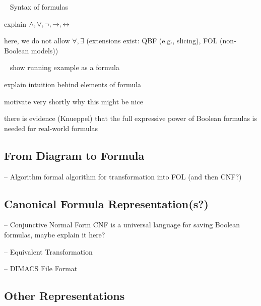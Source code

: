 \begin{frame}{~}
	Syntax of formulas

	explain $\wedge, \vee, \neg, \rightarrow, \leftrightarrow$

	here, we do not allow $\forall, \exists$ (extensions exist: QBF (e.g., slicing), FOL (non-Boolean models))
\end{frame}

\begin{frame}{~}
	show running example as a formula
	
	explain intuition behind elements of formula

	motivate very shortly why this might be nice

	there is evidence (Knueppel) that the full expressive power of Boolean formulas is needed for real-world formulas
\end{frame}

\subsection{From Diagram to Formula}

\begin{frame}{-- Algorithm}
	formal algorithm for transformation into FOL (and then CNF?)
\end{frame}

\subsection{Canonical Formula Representation(s?)}

\begin{frame}{-- Conjunctive Normal Form}
	CNF is a universal language for saving Boolean formulas, maybe explain it here?
\end{frame}

\begin{frame}{-- Equivalent Transformation}
	
\end{frame}

\begin{frame}{-- DIMACS File Format}
	
\end{frame}


\subsection{Other Representations} %


